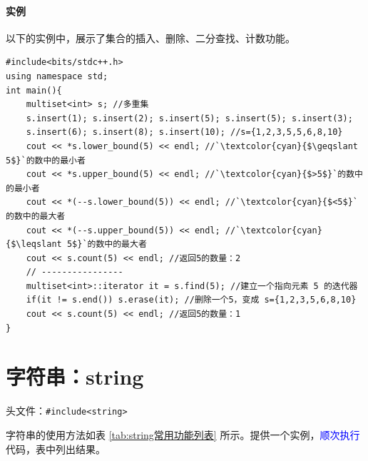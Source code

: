 \documentclass[UTF8]{ctexart}
\begin{document}
\paragraph{实例} 以下的实例中，展示了集合的插入、删除、二分查找、计数功能。
\begin{lstlisting}
#include<bits/stdc++.h>
using namespace std;
int main(){
	multiset<int> s; //多重集
	s.insert(1); s.insert(2); s.insert(5); s.insert(5); s.insert(3);
	s.insert(6); s.insert(8); s.insert(10); //s={1,2,3,5,5,6,8,10}
	cout << *s.lower_bound(5) << endl; //`\textcolor{cyan}{$\geqslant 5$}`的数中的最小者
	cout << *s.upper_bound(5) << endl; //`\textcolor{cyan}{$>5$}`的数中的最小者
	cout << *(--s.lower_bound(5)) << endl; //`\textcolor{cyan}{$<5$}`的数中的最大者
	cout << *(--s.upper_bound(5)) << endl; //`\textcolor{cyan}{$\leqslant 5$}`的数中的最大者
	cout << s.count(5) << endl; //返回5的数量：2
	// ----------------
	multiset<int>::iterator it = s.find(5); //建立一个指向元素 5 的迭代器
	if(it != s.end()) s.erase(it); //删除一个5，变成 s={1,2,3,5,6,8,10}
	cout << s.count(5) << endl; //返回5的数量：1
}
\end{lstlisting}

\section{字符串：string}
头文件：\verb!#include<string>!

字符串的使用方法如表 \ref{tab:string常用功能列表} 所示。提供一个实例，\textcolor{blue}{顺次执行}代码，表中列出结果。
\end{document}
